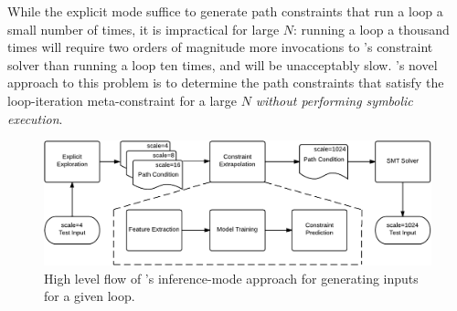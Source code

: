 While the explicit mode suffice to generate path constraints that run a loop a small number of times, it is impractical for large $N$: \eg running a loop a thousand times will require two orders of magnitude more invocations to \lancet's constraint solver than running a loop ten times, and will be unacceptably slow. \lancet's novel approach to this problem is to determine the path constraints that satisfy the loop-iteration meta-constraint for a large $N$ {\em without performing symbolic execution}.

\begin{figure}[tbp]
  \centering
  \includegraphics[width=\linewidth]{figures/lancet} %
  \caption{High level flow of \lancet's inference-mode approach for generating inputs for a given loop.}
  \label{fig:method}
\end{figure}


